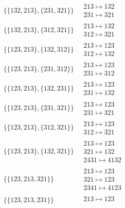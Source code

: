 \begin{scriptsize}
\begin{align}
\{\{132, 213\}, \{231, 321\}\}
\ 
&
\begin{matrix}
213 \mapsto 132
\\
231 \mapsto 321
\end{matrix}
\\
\{\{132, 213\}, \{312, 321\}\}
\ 
&
\begin{matrix}
213 \mapsto 132
\\
312 \mapsto 321
\end{matrix}
\\
\{\{123, 213\}, \{132, 312\}\}
\ 
&
\begin{matrix}
213 \mapsto 123
\\
312 \mapsto 132
\end{matrix}
\\
\{\{123, 213\}, \{231, 312\}\}
\ 
&
\begin{matrix}
213 \mapsto 123
\\
231 \mapsto 312
\end{matrix}
\\
\{\{123, 213\}, \{132, 231\}\}
\ 
&
\begin{matrix}
213 \mapsto 123
\\
231 \mapsto 132
\end{matrix}
\\
\{\{123, 213\}, \{231, 321\}\}
\ 
&
\begin{matrix}
213 \mapsto 123
\\
231 \mapsto 321
\end{matrix}
\\
\{\{123, 213\}, \{312, 321\}\}
\ 
&
\begin{matrix}
213 \mapsto 123
\\
312 \mapsto 321
\end{matrix}
\\
\{\{123, 213\}, \{132, 321\}\}
\ 
&
\begin{matrix}
213 \mapsto 123
\\
321 \mapsto 132
\\
2431 \mapsto 4132
\end{matrix}
\\
\{\{123, 213, 321\}\}
\ 
&
\begin{matrix}
213 \mapsto 123
\\
321 \mapsto 123
\\
2341 \mapsto 4123
\end{matrix}
\\
\{\{123, 213, 231\}\}
\ 
&
\begin{matrix}
213 \mapsto 123
\\

\end{matrix}
\end{align}
\end{scriptsize}
